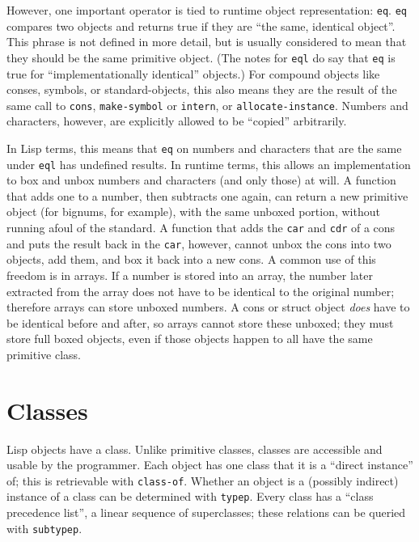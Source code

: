 \documentclass{article}
\begin{document}
However, one important operator is tied to runtime object representation: \texttt{eq}. \texttt{eq} compares two objects and returns true if they are ``the same, identical object''. This phrase is not defined in more detail, but is usually considered to mean that they should be the same primitive object. (The notes for \texttt{eql} do say that \texttt{eq} is true for ``implementationally identical'' objects.) For compound objects like conses, symbols, or standard-objects, this also means they are the result of the same call to \texttt{cons}, \texttt{make-symbol} or \texttt{intern}, or \texttt{allocate-instance}. Numbers and characters, however, are explicitly allowed to be ``copied'' arbitrarily.

In Lisp terms, this means that \texttt{eq} on numbers and characters that are the same under \texttt{eql} has undefined results. In runtime terms, this allows an implementation to box and unbox numbers and characters (and only those) at will. A function that adds one to a number, then subtracts one again, can return a new primitive object (for bignums, for example), with the same unboxed portion, without running afoul of the standard. A function that adds the \texttt{car} and \texttt{cdr} of a cons and puts the result back in the \texttt{car}, however, cannot unbox the cons into two objects, add them, and box it back into a new cons. A common use of this freedom is in arrays. If a number is stored into an array, the number later extracted from the array does not have to be identical to the original number; therefore arrays can store unboxed numbers. A cons or struct object \emph{does} have to be identical before and after, so arrays cannot store these unboxed; they must store full boxed objects, even if those objects happen to all have the same primitive class.



\section{Classes}

Lisp objects have a class. Unlike primitive classes, classes are accessible and usable by the programmer. Each object has one class that it is a ``direct instance'' of; this is retrievable with \texttt{class-of}. Whether an object is a (possibly indirect) instance of a class can be determined with \texttt{typep}. Every class has a ``class precedence list'', a linear sequence of superclasses; these relations can be queried with \texttt{subtypep}.
\end{document}
